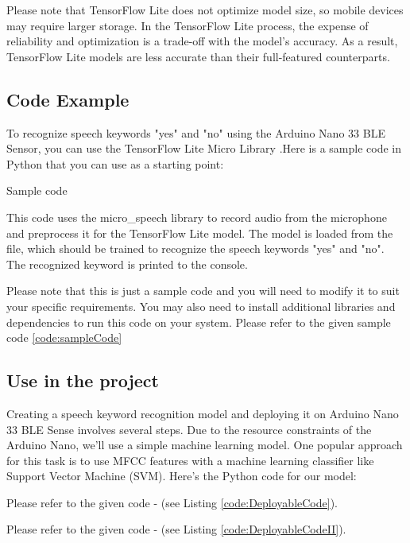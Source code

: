 Please note that TensorFlow Lite does not optimize model size, so mobile devices may require larger storage. In the TensorFlow Lite process, the expense of reliability and optimization is a trade-off with the model’s accuracy. As a result, TensorFlow Lite models are less accurate than their full-featured counterparts.

\subsection{Code Example}
To recognize speech keywords "yes" and "no" using the Arduino Nano 33 BLE Sensor, you can use the TensorFlow Lite Micro Library \cite{Arduino:2023}.Here is a sample code in Python that you can use as a starting point:

\begin{code}[h!]
	    
	
	\caption{Sample code}
	\label{code:sampleCode}
\end{code}

This code uses the micro\_speech library to record audio from the microphone and preprocess it for the TensorFlow Lite model. The model is loaded from the file, which should be trained to recognize the speech keywords "yes" and "no". The recognized keyword is printed to the console.

Please note that this is just a sample code and you will need to modify it to suit your specific requirements. You may also need to install additional libraries and dependencies to run this code on your system. Please refer to the given sample code \ref{code:sampleCode}


\subsection{Use in the project}
Creating a speech keyword recognition model and deploying it on Arduino Nano 33 BLE Sense involves several steps. Due to the resource constraints of the Arduino Nano, we'll use a simple machine learning model. One popular approach for this task is to use MFCC features with a machine learning classifier like Support Vector Machine (SVM).
Here's the Python code for our model:

Please refer to the given code - (see Listing \ref{code:DeployableCode}).

Please refer to the given code - (see Listing \ref{code:DeployableCodeII}).

